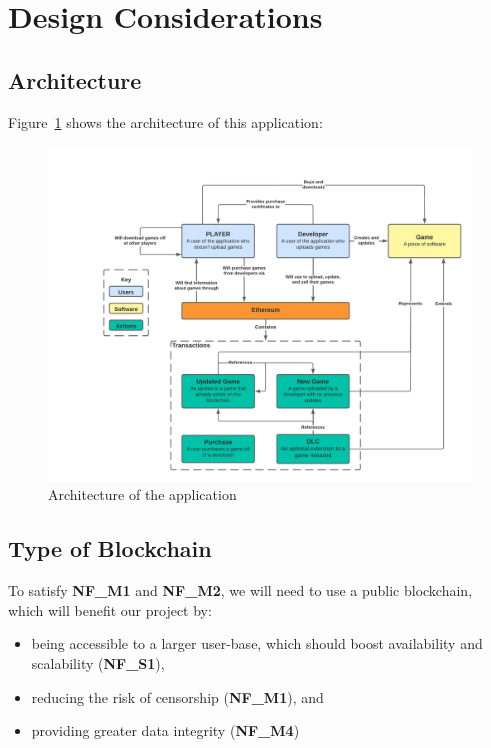 \newpage
\section{Design Considerations}

\subsection*{Architecture}

Figure~\ref{fig:architecture-diagram} shows the architecture of this application:

\begin{figure}[ht]
  \centering
  \includegraphics*[width=\textwidth]{assets/images/diagrams/architecture-diagram.png}
  \caption{Architecture of the application}
  \label{fig:architecture-diagram}
\end{figure}

\subsection*{Type of Blockchain}

To satisfy \textbf{NF\_M1} and \textbf{NF\_M2}, we will need to use a public blockchain, which will benefit our project by:
\vspace{2mm}
\begin{itemize}
  \item being accessible to a larger user-base, which should boost availability and scalability (\textbf{NF\_S1}),
  \item reducing the risk of censorship (\textbf{NF\_M1}), and
  \item providing greater data integrity (\textbf{NF\_M4})
\end{itemize}

